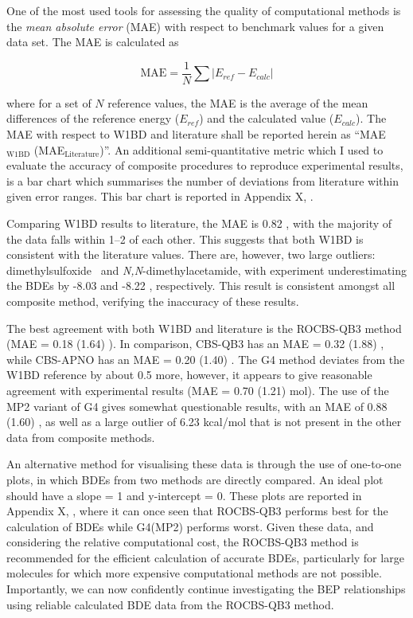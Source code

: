 One of the most used tools for assessing the quality of computational methods is the \emph{mean absolute error} (MAE) with respect to benchmark values for a given data set.\cite{Savin2014} The MAE is calculated as

\begin{equation}
  \mathrm{MAE} = \frac{1}{N} \sum | E_{ref} - E_{calc}|
\end{equation}

\noindent where for a set of $N$ reference values, the MAE is the average of the mean differences of the reference energy ($E_{ref}$) and the calculated value ($E_{calc}$). The MAE with respect to W1BD and literature shall be reported herein as ``MAE$_{\mathrm{W1BD}}$ (MAE$_{\mathrm{Literature}}$)''. An additional semi-quantitative metric which I used to evaluate the accuracy of composite procedures to reproduce experimental results, is a bar chart which summarises the number of deviations from literature within given error ranges. This bar chart is reported in Appendix X, .

Comparing W1BD results to literature, the MAE is 0.82 \kcalmol, with the majority of the data falls within 1--2 \kcalmol of each other. This suggests that both W1BD is consistent with the literature values. There are, however, two large outliers: dimethylsulfoxide\footnotemark~ and \emph{N,N}-dimethylacetamide, with experiment underestimating the BDEs by -8.03 and -8.22 \kcalmol, respectively. This result is consistent amongst all composite method, verifying the inaccuracy of these results.


The best agreement with both W1BD and literature is the ROCBS-QB3 method (MAE = 0.18 (1.64) \kcalmol). In comparison, CBS-QB3 has an MAE = 0.32 (1.88) \kcalmol, while CBS-APNO has an MAE = 0.20 (1.40) \kcalmol.  The G4 method deviates from the W1BD reference by about 0.5 \kcalmol more, however, it appears to give reasonable agreement with experimental results (MAE = 0.70 (1.21) mol). The use of the MP2 variant of G4 gives somewhat questionable results, with an MAE of 0.88 (1.60) \kcalmol, as well as a large outlier of 6.23 kcal/mol that is not present in the other data from composite methods.

An alternative method for visualising these data is through the use of one-to-one plots, in which BDEs from two methods are directly compared. An ideal plot should have a slope = 1 and y-intercept = 0. These plots are reported in Appendix X, , where it can once seen that ROCBS-QB3 performs best for the calculation of BDEs while G4(MP2) performs worst. Given these data, and considering the relative computational cost, the ROCBS-QB3 method is recommended for the efficient calculation of accurate BDEs, particularly for large molecules for which more expensive computational methods are not possible. Importantly, we can now confidently continue investigating the BEP relationships using reliable calculated BDE data from the ROCBS-QB3 method.

